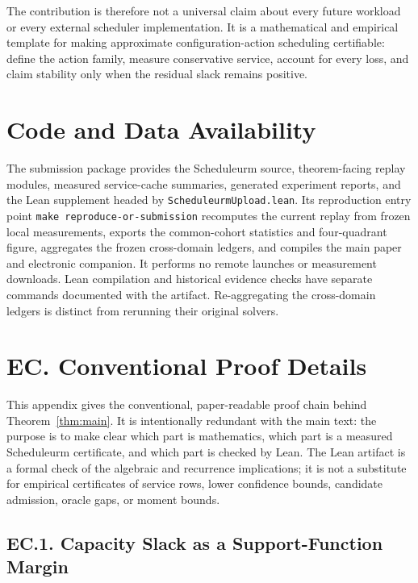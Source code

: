 \documentclass[opre,dblanonrev]{informs4}
\newif\ifECOnly
\begin{document}
The contribution is therefore not a universal claim about every future workload
or every external scheduler implementation.  It is a mathematical and empirical
template for making approximate configuration-action scheduling certifiable:
define the action family, measure conservative service, account for every loss,
and claim stability only when the residual slack remains positive.

\section*{Code and Data Availability}

The submission package provides the Scheduleurm source, theorem-facing replay
modules, measured service-cache summaries, generated experiment reports, and the
Lean supplement headed by \texttt{ScheduleurmUpload.lean}.  Its reproduction
entry point \texttt{make reproduce-or-submission} recomputes the current replay
from frozen local measurements, exports the common-cohort statistics and
four-quadrant figure, aggregates the frozen cross-domain ledgers, and compiles
the main paper and electronic companion.  It performs no remote launches or
measurement downloads.  Lean compilation and historical evidence checks have
separate commands documented with the artifact.  Re-aggregating the cross-domain
ledgers is distinct from rerunning their original solvers.

\fi
\ifECOnly
\section*{EC. Conventional Proof Details}
\label{app:conventional-proof}

This appendix gives the conventional, paper-readable proof chain behind
Theorem~\ref{thm:main}.  It is intentionally redundant with the main text:
the purpose is to make clear which part is mathematics, which part is a
measured Scheduleurm certificate, and which part is checked by Lean.  The Lean
artifact is a formal check of the algebraic and recurrence implications; it is
not a substitute for empirical certificates of service rows, lower confidence
bounds, candidate admission, oracle gaps, or moment bounds.

\subsection*{EC.1. Capacity Slack as a Support-Function Margin}
\end{document}
